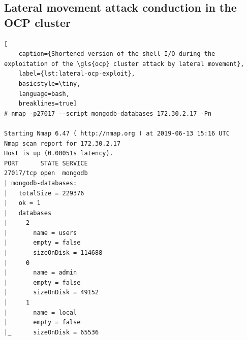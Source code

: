 \subsection{Lateral movement attack conduction in the OCP cluster}
\begin{lstlisting}[
	caption={Shortened version of the shell I/O during the exploitation of the \gls{ocp} cluster attack by lateral movement},
	label={lst:lateral-ocp-exploit},
	basicstyle=\tiny,
	language=bash,
	breaklines=true]
# nmap -p27017 --script mongodb-databases 172.30.2.17 -Pn

Starting Nmap 6.47 ( http://nmap.org ) at 2019-06-13 15:16 UTC
Nmap scan report for 172.30.2.17
Host is up (0.00051s latency).
PORT      STATE SERVICE
27017/tcp open  mongodb
| mongodb-databases:
|   totalSize = 229376
|   ok = 1
|   databases
|     2
|       name = users
|       empty = false
|       sizeOnDisk = 114688
|     0
|       name = admin
|       empty = false
|       sizeOnDisk = 49152
|     1
|       name = local
|       empty = false
|_      sizeOnDisk = 65536


\end{lstlisting}
